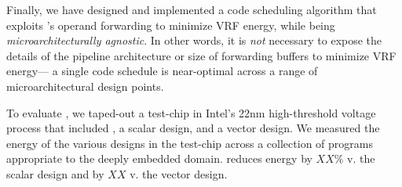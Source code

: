 Finally, we have designed and implemented a code scheduling algorithm
that exploits \manic's operand forwarding to minimize VRF energy, while being \emph{microarchitecturally agnostic}.
In other words, it is \emph{not} necessary to expose the details
of the pipeline architecture or size of forwarding buffers
to minimize VRF energy---%
a single code schedule is near-optimal across a range of microarchitectural design points.

To evaluate \manic, we taped-out a test-chip in Intel's 22nm high-threshold voltage process that included \manic, a scalar design, and a vector design.
We measured the energy of the various designs in the test-chip across a collection of programs appropriate to the deeply embedded domain.
%
\manic reduces energy by $XX\%$ v. the scalar design and by $XX$ v. the vector design.
% 
%